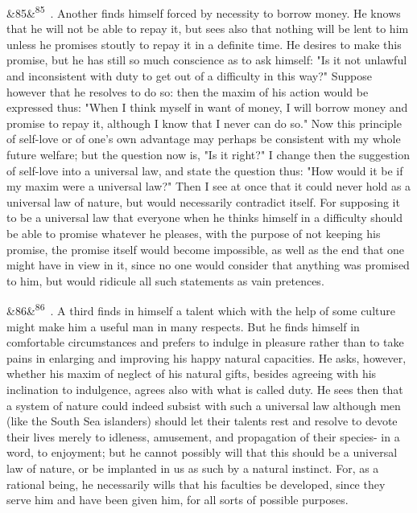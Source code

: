 \documentclass[12pt]{article}
\newcommand{\para}[1][]{\par\noindent\ifx&#1&\else\textsuperscript{\footnotesize #1}~\fi}
\begin{document}
\para[85] 2. Another finds himself forced by necessity to borrow money. He knows that he will not be able to repay it, but sees also that nothing will be lent to him unless he promises stoutly to repay it in a definite time. He desires to make this promise, but he has still so much conscience as to ask himself: "Is it not unlawful and inconsistent with duty to get out of a difficulty in this way?" Suppose however that he resolves to do so: then the maxim of his action would be expressed thus: "When I think myself in want of money, I will borrow money and promise to repay it, although I know that I never can do so." Now this principle of self-love or of one's own advantage may perhaps be consistent with my whole future welfare; but the question now is, "Is it right?" I change then the suggestion of self-love into a universal law, and state the question thus: "How would it be if my maxim were a universal law?" Then I see at once that it could never hold as a universal law of nature, but would necessarily contradict itself. For supposing it to be a universal law that everyone when he thinks himself in a difficulty should be able to promise whatever he pleases, with the purpose of not keeping his promise, the promise itself would become impossible, as well as the end that one might have in view in it, since no one would consider that anything was promised to him, but would ridicule all such statements as vain pretences.

\para[86] 3. A third finds in himself a talent which with the help of some culture might make him a useful man in many respects. But he finds himself in comfortable circumstances and prefers to indulge in pleasure rather than to take pains in enlarging and improving his happy natural capacities. He asks, however, whether his maxim of neglect of his natural gifts, besides agreeing with his inclination to indulgence, agrees also with what is called duty. He sees then that a system of nature could indeed subsist with such a universal law although men (like the South Sea islanders) should let their talents rest and resolve to devote their lives merely to idleness, amusement, and propagation of their species- in a word, to enjoyment; but he cannot possibly will that this should be a universal law of nature, or be implanted in us as such by a natural instinct. For, as a rational being, he necessarily wills that his faculties be developed, since they serve him and have been given him, for all sorts of possible purposes.
\end{document}
